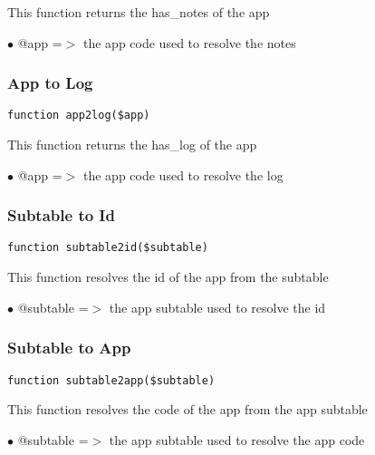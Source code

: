 \documentclass[a4paper]{article}
\begin{document}
This function returns the has\_notes of the app

\begin{compactitem}
\item[\color{myblue}$\bullet$] @app =$>$ the app code used to resolve the notes
\end{compactitem}

\hypertarget{toc32}{}
\subsubsection{App to Log}

\begin{lstlisting}
function app2log($app)
\end{lstlisting}

This function returns the has\_log of the app

\begin{compactitem}
\item[\color{myblue}$\bullet$] @app =$>$ the app code used to resolve the log
\end{compactitem}

\hypertarget{toc33}{}
\subsubsection{Subtable to Id}

\begin{lstlisting}
function subtable2id($subtable)
\end{lstlisting}

This function resolves the id of the app from the subtable

\begin{compactitem}
\item[\color{myblue}$\bullet$] @subtable =$>$ the app subtable used to resolve the id
\end{compactitem}

\hypertarget{toc34}{}
\subsubsection{Subtable to App}

\begin{lstlisting}
function subtable2app($subtable)
\end{lstlisting}

This function resolves the code of the app from the app subtable

\begin{compactitem}
\item[\color{myblue}$\bullet$] @subtable =$>$ the app subtable used to resolve the app code
\end{compactitem}
\end{document}
